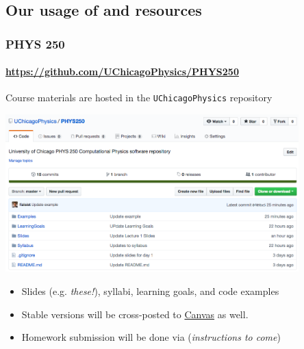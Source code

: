 \documentclass[hyperref={colorlinks=true}]{beamer}
\begin{document}
\begin{frame}
\begin{columns}
  \end{columns}
  
  
\end{frame}



\subsection[Our usage of \git and \github resources]{Our usage of \git and \github resources}

\begin{frame}%
  \frametitle{PHYS 250 \github}
  \framesubtitle{\url{https://github.com/UChicagoPhysics/PHYS250}}
  
  Course materials are hosted in the \github \texttt{UChicagoPhysics} repository
  
  \begin{center}
    \includegraphics[width=0.85\textwidth]{../Lecture1/PHYS250-GitHub.png}
  \end{center}

  \vspace{-0.5cm}

  \begin{itemize}
    \item Slides (e.g. \textit{these!}), syllabi, learning goals, and code examples
    \item Stable versions will be cross-posted to \href{\CanvasURL}{Canvas} as well.
    \item Homework submission will be done via \github (\textit{instructions to come})
  \end{itemize}
  
  
\end{frame}
\end{document}
